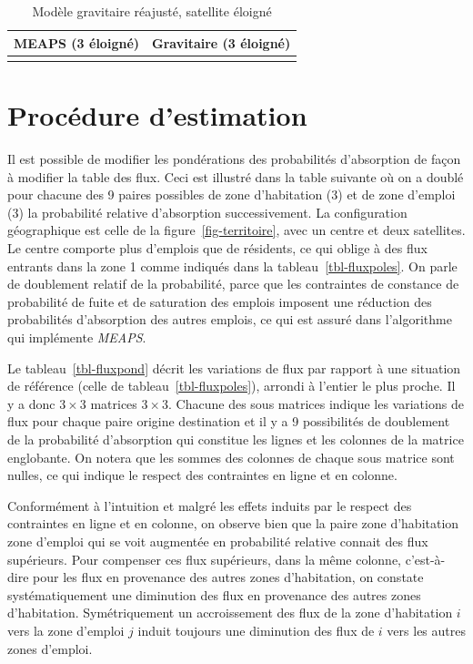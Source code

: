 \documentclass[
  10pt,
  a4paper,
  numbers=noendperiod,
  DIV=9]{scrreprt}
\begin{document}
\hypertarget{tbl-fluxgrav3}{}
\begin{longtable}{cc}
\caption{\label{tbl-fluxgrav3}Modèle gravitaire réajusté, satellite éloigné }\tabularnewline

\toprule
MEAPS (3 éloigné) & Gravitaire (3 éloigné) \\ 
\midrule
 &  \\ 
\bottomrule
\end{longtable}

\hypertarget{sec-estimation}{%
\section{Procédure d'estimation}\label{sec-estimation}}

Il est possible de modifier les pondérations des probabilités
d'absorption de façon à modifier la table des flux. Ceci est illustré
dans la table suivante où on a doublé pour chacune des 9 paires
possibles de zone d'habitation (3) et de zone d'emploi (3) la
probabilité relative d'absorption successivement. La configuration
géographique est celle de la figure~\ref{fig-territoire}, avec un centre
et deux satellites. Le centre comporte plus d'emplois que de résidents,
ce qui oblige à des flux entrants dans la zone 1 comme indiqués dans la
tableau~\ref{tbl-fluxpoles}. On parle de doublement relatif de la
probabilité, parce que les contraintes de constance de probabilité de
fuite et de saturation des emplois imposent une réduction des
probabilités d'absorption des autres emplois, ce qui est assuré dans
l'algorithme qui implémente \emph{MEAPS}.

Le tableau~\ref{tbl-fluxpond} décrit les variations de flux par rapport
à une situation de référence (celle de tableau~\ref{tbl-fluxpoles}),
arrondi à l'entier le plus proche. Il y a donc \(3 \times 3\) matrices
\(3 \times 3\). Chacune des sous matrices indique les variations de flux
pour chaque paire origine destination et il y a 9 possibilités de
doublement de la probabilité d'absorption qui constitue les lignes et
les colonnes de la matrice englobante. On notera que les sommes des
colonnes de chaque sous matrice sont nulles, ce qui indique le respect
des contraintes en ligne et en colonne.

Conformément à l'intuition et malgré les effets induits par le respect
des contraintes en ligne et en colonne, on observe bien que la paire
zone d'habitation zone d'emploi qui se voit augmentée en probabilité
relative connait des flux supérieurs. Pour compenser ces flux
supérieurs, dans la même colonne, c'est-à-dire pour les flux en
provenance des autres zones d'habitation, on constate systématiquement
une diminution des flux en provenance des autres zones d'habitation.
Symétriquement un accroissement des flux de la zone d'habitation \(i\)
vers la zone d'emploi \(j\) induit toujours une diminution des flux de
\(i\) vers les autres zones d'emploi.
\end{document}

